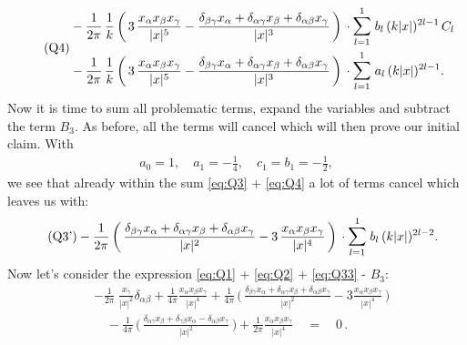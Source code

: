 \begin{align}
  \label{eq:Q4}
  \tag{Q4}
  \begin{alignedat}{1}
    &- \frac{1}{2\pi} \, \frac{1}{k} \, \bigg(\, 3\, \frac{x_\alpha x_\beta x_\gamma}{|x|^5} - \frac{\delta_{\beta\gamma} x_\alpha + \delta_{\alpha\gamma} x_\beta + \delta_{\alpha\beta} x_\gamma}{|x|^3} \, \bigg)  
   \,\cdot \mathlarger{\sum}_{l = 1}^1 \; b_l \, (k|x|)^{2l - 1} \, C_l  \\
    &- \frac{1}{2\pi} \, \frac{1}{k} \, \bigg( \, 3\, \frac{x_\alpha x_\beta x_\gamma}{|x|^5} - \frac{\delta_{\beta\gamma} x_\alpha + \delta_{\alpha\gamma} x_\beta + \delta_{\alpha\beta} x_\gamma}{|x|^3} \, \bigg)  
  \,\cdot \mathlarger{\sum}_{l = 1}^1 \; a_l \, (k|x|)^{2l - 1} .
  \end{alignedat}
\end{align}
Now it is time to sum all problematic terms, expand the variables and subtract the term $B_3$. 
As before, all the terms will cancel which will then prove our initial claim. 
With
\begin{align*}
  a_0 = 1, \quad a_1 = -\frac{1}{4}, \quad c_1 = b_1 =  -\frac{1}{2},
\end{align*}
we see that already within the sum \eqref{eq:Q3} + \eqref{eq:Q4} a lot of terms cancel which leaves us with:
\begin{align*}
  \label{eq:Q33}
  \tag{Q3'}
  &- \frac{1}{2\pi} \, \bigg(\, \frac{\delta_{\beta\gamma} x_\alpha + \delta_{\alpha \gamma} x_\beta + \delta_{\alpha \beta} x_\gamma}{|x|^2} - 3\, \frac{x_\alpha x_\beta x_\gamma}{|x|^4} \, \bigg) 
  \, \cdot \mathlarger{\sum}_{l = 1}^1 \; b_l \, (k|x|)^{2l - 2}.
\end{align*}
Now let's consider the expression \eqref{eq:Q1} + \eqref{eq:Q2} + \eqref{eq:Q33} - $B_3$:
\begin{align*}
  &-\frac{1}{2\pi} \;  \frac{x_\gamma}{|x|^2} \delta_{\alpha\beta}
  + \frac{1}{4 \pi } \frac{x_\alpha x_\beta x_\gamma}{|x|^4} 
  + \frac{1}{4\pi} \, \bigg(\,\frac{\delta_{\beta\gamma} x_\alpha + \delta_{\alpha \gamma} x_\beta + \delta_{\alpha \beta} x_\gamma}{|x|^2} - 3 \frac{x_\alpha x_\beta x_\gamma}{|x|^4} \, \bigg) 
   \\[0.5em]
 &\quad - \frac{1}{4 \pi} \, \bigg(\, \frac{\delta_{\alpha\gamma} x_\beta + \delta_{\gamma\beta} x_\alpha  - \delta_{\alpha\beta} x_\gamma}{|x|^2} \, \bigg) 
  + \frac{1}{2\pi} \frac{x_\alpha x_\beta x_\gamma}{|x|^4}
  \quad = \quad 0\, .
\end{align*}
